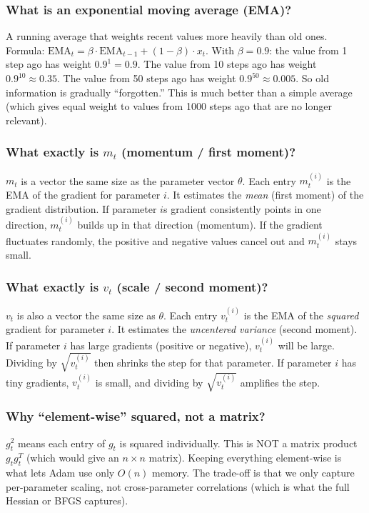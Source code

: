 \documentclass[11pt, letterpaper]{article}
\begin{document}
\begin{deepdive}
\subsubsection{What is an exponential moving average (EMA)?}
A running average that weights recent values more heavily than old ones. Formula: $\text{EMA}_t = \beta \cdot \text{EMA}_{t-1} + (1 - \beta) \cdot x_t$. With $\beta = 0.9$: the value from 1 step ago has weight $0.9^1 = 0.9$. The value from 10 steps ago has weight $0.9^{10} \approx 0.35$. The value from 50 steps ago has weight $0.9^{50} \approx 0.005$. So old information is gradually ``forgotten.'' This is much better than a simple average (which gives equal weight to values from 1000 steps ago that are no longer relevant).

\subsubsection{What exactly is $m_t$ (momentum / first moment)?}
$m_t$ is a vector the same size as the parameter vector $\theta$. Each entry $m_t^{(i)}$ is the EMA of the gradient for parameter $i$. It estimates the \textit{mean} (first moment) of the gradient distribution. If parameter $i$s gradient consistently points in one direction, $m_t^{(i)}$ builds up in that direction (momentum). If the gradient fluctuates randomly, the positive and negative values cancel out and $m_t^{(i)}$ stays small.

\subsubsection{What exactly is $v_t$ (scale / second moment)?}
$v_t$ is also a vector the same size as $\theta$. Each entry $v_t^{(i)}$ is the EMA of the \textit{squared} gradient for parameter $i$. It estimates the \textit{uncentered variance} (second moment). If parameter $i$ has large gradients (positive or negative), $v_t^{(i)}$ will be large. Dividing by $\sqrt{v_t^{(i)}}$ then shrinks the step for that parameter. If parameter $i$ has tiny gradients, $v_t^{(i)}$ is small, and dividing by $\sqrt{v_t^{(i)}}$ amplifies the step.

\subsubsection{Why ``element-wise'' squared, not a matrix?}
$g_t^2$ means each entry of $g_t$ is squared individually. This is NOT a matrix product $g_t g_t^T$ (which would give an $n \times n$ matrix). Keeping everything element-wise is what lets Adam use only $O(n)$ memory. The trade-off is that we only capture per-parameter scaling, not cross-parameter correlations (which is what the full Hessian or BFGS captures).


\end{deepdive}
\end{document}
